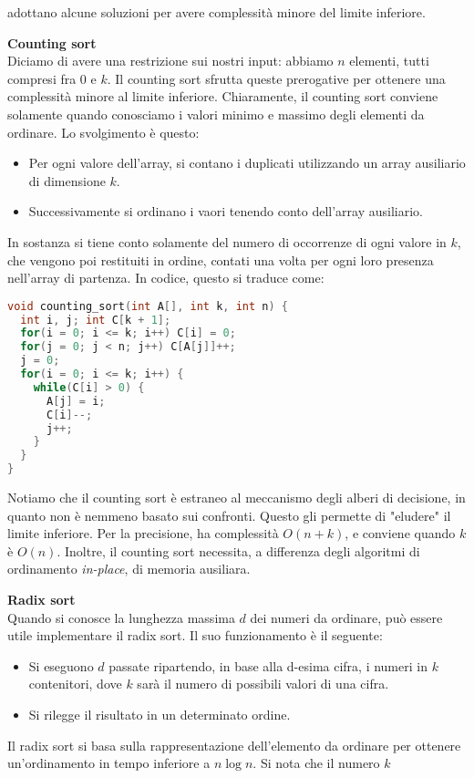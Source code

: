 \documentclass[a4paper,12pt]{article}
\begin{document}
adottano alcune soluzioni per avere complessità minore del limite inferiore.
\par\smallskip
\textbf{Counting sort} \\
Diciamo di avere una restrizione sui nostri input: abbiamo $n$ elementi, tutti compresi fra 0 e $k$. Il counting sort sfrutta queste prerogative
per ottenere una complessità minore al limite inferiore. Chiaramente, il counting sort conviene solamente quando conosciamo i valori minimo e massimo degli elementi da ordinare.
Lo svolgimento è questo:
\begin{itemize}
  \item Per ogni valore dell'array, si contano i duplicati utilizzando un array ausiliario di dimensione $k$.
  \item Successivamente si ordinano i vaori tenendo conto dell'array ausiliario.
\end{itemize}
In sostanza si tiene conto solamente del numero di occorrenze di ogni valore in $k$, che vengono poi restituiti in ordine, contati una volta per ogni loro presenza nell'array di partenza.
In codice, questo si traduce come:
\begin{lstlisting}[language=C++]
void counting_sort(int A[], int k, int n) {
  int i, j; int C[k + 1];
  for(i = 0; i <= k; i++) C[i] = 0;
  for(j = 0; j < n; j++) C[A[j]]++;
  j = 0;
  for(i = 0; i <= k; i++) {
    while(C[i] > 0) {
      A[j] = i;
      C[i]--;
      j++;
    }
  }
}
\end{lstlisting}
Notiamo che il counting sort è estraneo al meccanismo degli alberi di decisione, in quanto non è nemmeno basato sui confronti. Questo gli permette
di "eludere" il limite inferiore. Per la precisione, ha complessità $O(n+k)$, e conviene quando $k$ è $O(n)$. Inoltre, il counting sort
necessita, a differenza degli algoritmi di ordinamento \textit{in-place}, di memoria ausiliara.
\par\smallskip
\textbf{Radix sort} \\
Quando si conosce la lunghezza massima $d$ dei numeri da ordinare, può essere utile implementare il radix sort. Il suo funzionamento è il seguente:
\begin{itemize}
  \item Si eseguono $d$ passate ripartendo, in base alla d-esima cifra, i numeri in $k$ contenitori, dove $k$ sarà il numero di possibili valori di una cifra.
  \item Si rilegge il risultato in un determinato ordine.
\end{itemize}
Il radix sort si basa sulla rappresentazione dell'elemento da ordinare per ottenere un'ordinamento in tempo inferiore a $n\log{n}$. Si nota che il numero $k$
\end{document}
